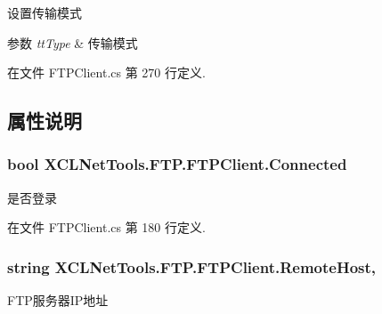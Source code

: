 设置传输模式 


\begin{DoxyParams}{参数}
{\em tt\-Type} & 传输模式\\
\hline
\end{DoxyParams}


在文件 F\-T\-P\-Client.\-cs 第 270 行定义.



\subsection{属性说明}
\hypertarget{class_x_c_l_net_tools_1_1_f_t_p_1_1_f_t_p_client_af3e0775ddf1dc1530b82b5b0a6aa4d25}{
\subsubsection[{Connected}]{\setlength{\rightskip}{0pt plus 5cm}bool X\-C\-L\-Net\-Tools.\-F\-T\-P.\-F\-T\-P\-Client.\-Connected\hspace{0.3cm}{\ttfamily [get]}}}\label{class_x_c_l_net_tools_1_1_f_t_p_1_1_f_t_p_client_af3e0775ddf1dc1530b82b5b0a6aa4d25}


是否登录 



在文件 F\-T\-P\-Client.\-cs 第 180 行定义.

\hypertarget{class_x_c_l_net_tools_1_1_f_t_p_1_1_f_t_p_client_a020891b3ab32deba2b8e2b2204349f1d}{
\subsubsection[{Remote\-Host}]{\setlength{\rightskip}{0pt plus 5cm}string X\-C\-L\-Net\-Tools.\-F\-T\-P.\-F\-T\-P\-Client.\-Remote\-Host\hspace{0.3cm}{\ttfamily [get]}, {\ttfamily [set]}}}\label{class_x_c_l_net_tools_1_1_f_t_p_1_1_f_t_p_client_a020891b3ab32deba2b8e2b2204349f1d}


F\-T\-P服务器\-I\-P地址 



